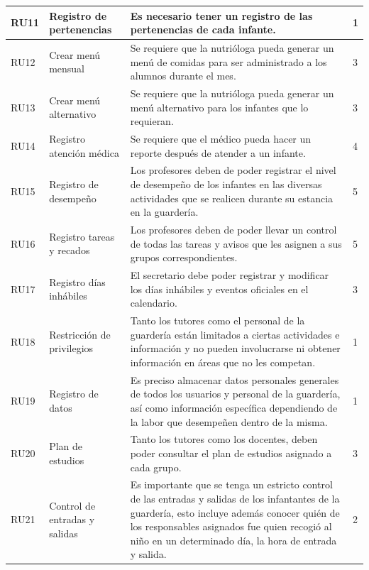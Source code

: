 \documentclass{article}
\begin{document}
\begin{longtable}{|p{1.0cm}|p{3.8cm}|p{5.0cm}|p{1.2cm}|}
	RU11 &
	Registro de pertenencias &
	Es necesario tener un registro de las pertenencias de cada infante. &
	1
	\\ \hline

	RU12 &
	Crear menú mensual &
	Se requiere que la nutrióloga pueda generar un menú de comidas para ser administrado a los alumnos durante el mes. &
	3
	\\ \hline

	RU13 &
	Crear menú alternativo &
	Se requiere que la nutrióloga pueda generar un menú alternativo para los infantes que lo requieran. &
	3
	\\ \hline

	RU14 &
	Registro atención médica &
	Se requiere que el médico pueda hacer un reporte después de atender a un infante. &
	4
	\\ \hline

	RU15 &
	Registro de desempeño &
	Los profesores deben de poder registrar el nivel de desempeño de los infantes en las  diversas actividades que se realicen durante su estancia en la guardería. &
	5
	\\ \hline

	RU16 &
	Registro tareas y recados &
	Los profesores deben de poder llevar un control de todas las tareas y avisos que les asignen a sus grupos correspondientes. &
	5
	\\ \hline

	RU17 &
	Registro días inhábiles &
	El secretario debe poder registrar y modificar los días inhábiles y eventos oficiales  en el calendario. &
	3
	\\ \hline

	RU18 &
	Restricción de privilegios &
	Tanto los tutores como el personal de la guardería están limitados a ciertas actividades e información y no pueden involucrarse ni obtener información en áreas que no les competan. &
	1
	\\ \hline

	RU19 &
	Registro de datos &
	Es preciso almacenar datos personales generales de todos los usuarios y personal de la guardería, así como información específica dependiendo de la labor que desempeñen dentro de la misma. &
	1
	\\ \hline

	RU20 &
	Plan de estudios &
	Tanto los tutores como los docentes, deben poder consultar el plan de estudios asignado a cada grupo. &
	3
	\\ \hline

	RU21 &
	Control de entradas y salidas &
	Es importante que se tenga un estricto control de las entradas y salidas de los infantantes de la guardería, esto incluye además conocer quién de los responsables asignados fue quien recogió al niño en un determinado día, la hora de entrada y salida. &
	2
	\\ \hline


\end{longtable}
\end{document}
